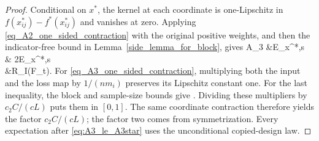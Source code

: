 \documentclass[twoside,11pt]{article}
\newenvironment{revision}{\color{revisionred}}{}
\begin{document}
\begin{proof}
\begin{revision}
Conditional on $x^*$, the kernel at each coordinate is one-Lipschitz
in $f(x_{ij}^*)-f^*(x_{ij}^*)$ and vanishes at zero.
Applying \eqref{eq_A2_one_sided_contraction} with the original positive
weights, and then the indicator-free bound in
Lemma~\ref{side_lemma_for_block}, gives
\bea
A_3
&\mathbb E_{x^*,s}\left[
\sup_{f-f^*\in\mathcal F_t}\frac1n
\sum_{i\in I}\frac1{m_i}\sum_{j=1}^{m_i}
s_{ij}Z_{ij}^*(f)\right]\\
&
2\mathbb E_{x^*,s}\left[
\sup_{h\in\mathcal F_t}\frac1n
\sum_{i\in I}\frac1{m_i}\sum_{j=1}^{m_i}
s_{ij}h(x_{ij}^*)\right]\\
&\le{}R_I(\mathcal F_t).
\bea
For \eqref{eq_A3_one_sided_contraction}, multiplying both the input
and the loss map by $1/(nm_i)$ preserves its Lipschitz constant one.
For the last inequality, the block and sample-size bounds give
\bea
{}
\le{}
\le{}.
\bea
Dividing these multipliers by $c_2C/(cL)$ puts them in $[0,1]$.
The same coordinate contraction therefore yields the factor
$c_2C/(cL)$; the factor two comes
from symmetrization. Every expectation after
\eqref{eq:A3_le_A3star} uses the unconditional copied-design law.
\end{revision}
\end{proof}




\end{document}
